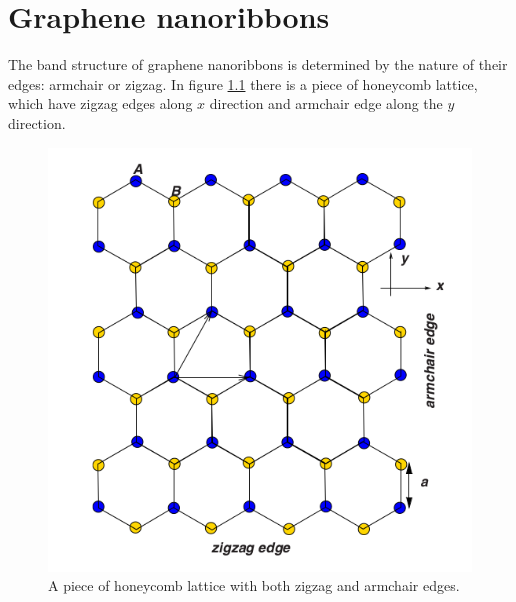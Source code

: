 \chapter{Graphene nanoribbons}
The band structure of graphene nanoribbons is determined by the nature of their edges: armchair or zigzag. In figure \ref{fig:edges} there is a piece of honeycomb lattice, which have zigzag edges along $x$ direction and armchair edge along the $y$ direction. 
\begin{figure}[h] 
\begin{center}
  \includegraphics[width=0.3\linewidth]{img/nanoribbbon_edges}
  \caption{A piece of honeycomb lattice with both zigzag and armchair edges. \label{fig:edges}}
\end{center}
\end{figure}


